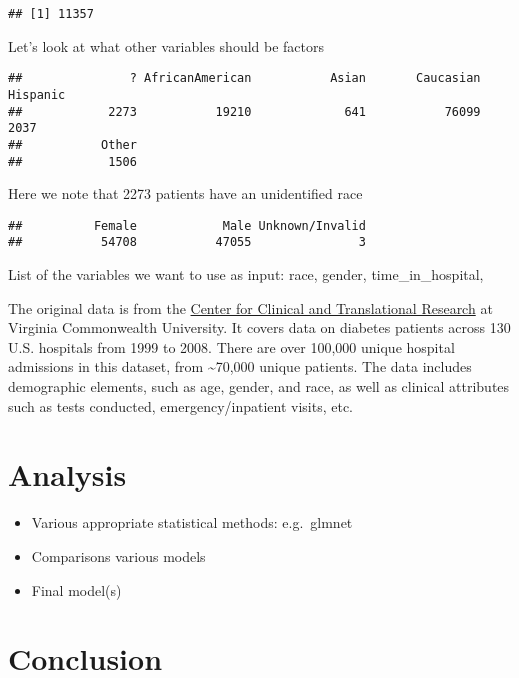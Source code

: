 \documentclass[
]{article}
\providecommand{\tightlist}{%
  \setlength{\itemsep}{0pt}\setlength{\parskip}{0pt}}
\begin{document}
\begin{verbatim}
## [1] 11357
\end{verbatim}

Let's look at what other variables should be factors

\begin{verbatim}
##               ? AfricanAmerican           Asian       Caucasian        Hispanic 
##            2273           19210             641           76099            2037 
##           Other 
##            1506
\end{verbatim}

Here we note that 2273 patients have an unidentified race

\begin{verbatim}
##          Female            Male Unknown/Invalid 
##           54708           47055               3
\end{verbatim}

List of the variables we want to use as input: race, gender,
time\_in\_hospital,

The original data is from the
\href{https://archive.ics.uci.edu/ml/datasets/Diabetes+130-US+hospitals+for+years+1999-2008}{Center
for Clinical and Translational Research} at Virginia Commonwealth
University. It covers data on diabetes patients across 130 U.S.
hospitals from 1999 to 2008. There are over 100,000 unique hospital
admissions in this dataset, from \textasciitilde70,000 unique patients.
The data includes demographic elements, such as age, gender, and race,
as well as clinical attributes such as tests conducted,
emergency/inpatient visits, etc.

\hypertarget{analysis}{%
\section{Analysis}\label{analysis}}

\begin{itemize}
\tightlist
\item
  Various appropriate statistical methods: e.g.~glmnet
\item
  Comparisons various models
\item
  Final model(s)
\end{itemize}

\hypertarget{conclusion}{%
\section{Conclusion}\label{conclusion}}
\end{document}
